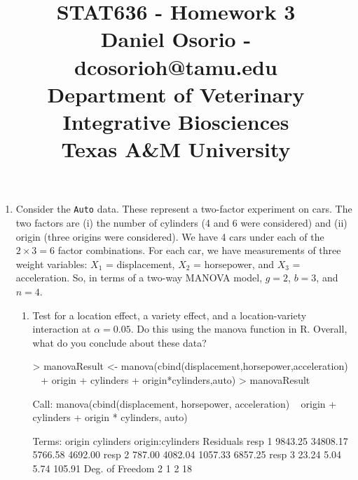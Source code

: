 \documentclass[12pt,a4paper]{paper}
\begin{document}
\title{STAT636 - Homework 3\\\small{Daniel Osorio - dcosorioh@tamu.edu\\Department of Veterinary Integrative Biosciences\\Texas A\&M University}}
\maketitle

\begin{enumerate}
\item Consider the \texttt{Auto} data. These represent a two-factor experiment on cars. The two factors are (i) the number of cylinders (4 and 6 were considered) and (ii) origin (three origins were considered). We have 4 cars under each of the $2 \times 3 = 6$ factor combinations. For each car, we have measurements of three weight variables: $X_{1}$ = displacement, $X_{2}$ = horsepower, and $X_{3}$ = acceleration. So, in terms of a two-way MANOVA model, $g = 2$, $b = 3$, and $n = 4$.
\begin{enumerate}
\begin{Schunk}
\begin{Sinput}
> auto<- read.csv("Auto_hw.csv")
> auto$cylinders <- as.factor(auto$cylinders)
> auto$origin <- as.factor(auto$origin)
\end{Sinput}
\end{Schunk}
\item Test for a location effect, a variety effect, and a location-variety interaction at $\alpha = 0.05$. Do this using the manova function in R. Overall, what do you conclude about these data?
\begin{Schunk}
\begin{Sinput}
> manovaResult <- manova(cbind(displacement,horsepower,acceleration) ~ 
+                          origin + cylinders + origin*cylinders,auto)
> manovaResult
\end{Sinput}
\begin{Soutput}
Call:
   manova(cbind(displacement, horsepower, acceleration) ~ origin + 
    cylinders + origin * cylinders, auto)

Terms:
                  origin cylinders origin:cylinders Residuals
resp 1           9843.25  34808.17          5766.58   4692.00
resp 2            787.00   4082.04          1057.33   6857.25
resp 3             23.24      5.04             5.74    105.91
Deg. of Freedom        2         1                2        18


\end{Soutput}
\end{Schunk}
\end{enumerate}
\end{enumerate}
\end{document}
